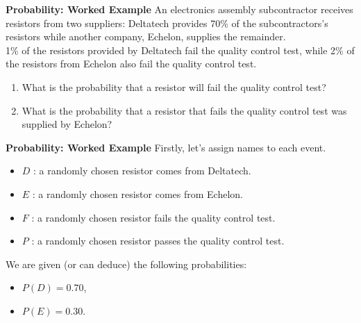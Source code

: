 \documentclass[]{report}
\begin{document}
\noindent \textbf{Probability: Worked Example }
An electronics assembly subcontractor receives resistors from two suppliers: Deltatech provides
70\% of the subcontractors's resistors while another company, Echelon, supplies the remainder.
\\
1\% of the resistors provided by Deltatech fail the quality control test, while 2\% of the
resistors from Echelon also fail the quality control test.

\begin{enumerate}
	\item What is the probability that a resistor will fail the quality control test?
	\item What is the probability that a resistor that fails the quality control test was supplied by Echelon?
\end{enumerate}


\noindent \textbf{Probability: Worked Example}
Firstly, let's assign names to each event.
\begin{itemize}
	\item $D$ : a randomly chosen resistor comes from Deltatech.
	\item $E$ : a randomly chosen resistor comes from Echelon.
	\item $F$ : a randomly chosen resistor fails the quality control test.
	\item $P$ : a randomly chosen resistor passes the quality control test.
\end{itemize}
\bigskip
We are given (or can deduce) the following probabilities:
\begin{itemize}
	\item $P(D) = 0.70$,
	\item $P(E) = 0.30$.
\end{itemize}
\end{document}
